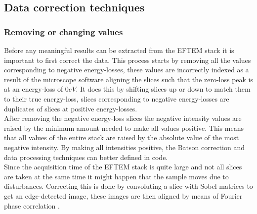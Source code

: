 \begin{multicols}{2}
\subsection{Data correction techniques}
\subsubsection{Removing or changing values}
Before any meaningful results can be extracted from the EFTEM stack it is important to first correct the data.
This process starts by removing all the values corresponding to negative energy-losses, these values are incorrectly indexed as a result of the microscope software aligning the slices such that the zero-loss peak is at an energy-loss of $0eV$.
It does this by shifting slices up or down to match them to their true energy-loss, slices corresponding to negative energy-losses are duplicates of slices at positive energy-losses.\\
After removing the negative energy-loss slices the negative intensity values are raised by the minimum amount needed to make all values positive.
This means that all values of the entire stack are raised by the absolute value of the most negative intensity. By making all intensities positive, the Batson correction and data processing techniques can better defined in code.\\
Since the acquisition time of the EFTEM stack is quite large and not all slices are taken at the same time it might happen that the sample moves due to disturbances. Correcting this is done by convoluting a slice with Sobel matrices to get an edge-detected image, these images are then aligned by means of Fourier phase correlation \cite{Sjodahl:93,SCHAFFER200427}.\\
%

\end{multicols}
